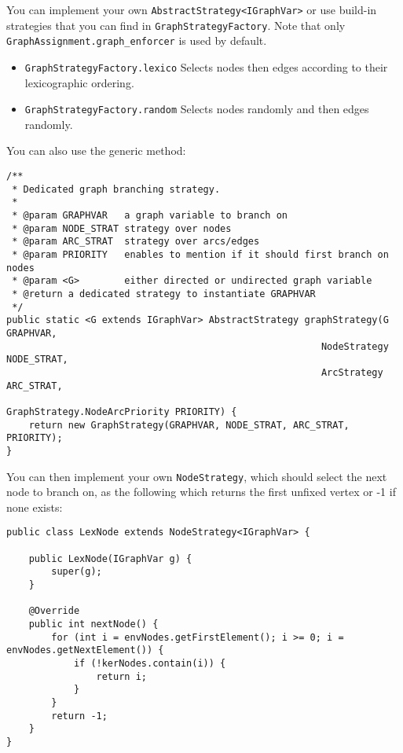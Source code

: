 \documentclass{article}
\begin{document}
You can implement your own \texttt{AbstractStrategy<IGraphVar>} or use build-in strategies that you can find in \texttt{GraphStrategyFactory}. 
Note that only \texttt{GraphAssignment.graph\_enforcer} is used by default. 

\begin{itemize}
\item  \texttt{GraphStrategyFactory.lexico} Selects nodes then edges according to their lexicographic ordering.
\item  \texttt{GraphStrategyFactory.random} Selects nodes randomly and then edges randomly. 
\end{itemize}

You can also use the generic method:
\begin{lstlisting}
/**
 * Dedicated graph branching strategy.
 *
 * @param GRAPHVAR   a graph variable to branch on
 * @param NODE_STRAT strategy over nodes
 * @param ARC_STRAT  strategy over arcs/edges
 * @param PRIORITY   enables to mention if it should first branch on nodes
 * @param <G>        either directed or undirected graph variable
 * @return a dedicated strategy to instantiate GRAPHVAR
 */
public static <G extends IGraphVar> AbstractStrategy graphStrategy(G GRAPHVAR, 
														NodeStrategy NODE_STRAT, 
														ArcStrategy ARC_STRAT, 
														GraphStrategy.NodeArcPriority PRIORITY) {
	return new GraphStrategy(GRAPHVAR, NODE_STRAT, ARC_STRAT, PRIORITY);
}
\end{lstlisting}

You can then implement your own \texttt{NodeStrategy}, which should select the next node to branch on, as the following which returns the first unfixed vertex or -1 if none exists: 
\begin{lstlisting}
public class LexNode extends NodeStrategy<IGraphVar> {

	public LexNode(IGraphVar g) {
		super(g);
	}

	@Override
	public int nextNode() {
		for (int i = envNodes.getFirstElement(); i >= 0; i = envNodes.getNextElement()) {
			if (!kerNodes.contain(i)) {
				return i;
			}
		}
		return -1;
	}
}
\end{lstlisting}
\end{document}
